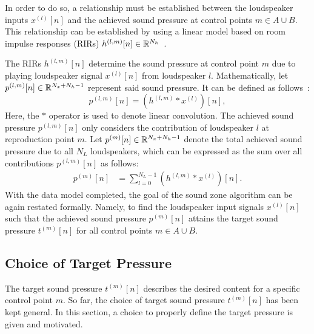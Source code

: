 In order to do so, a relationship must be established between the loudspeaker inputs $x^{(l)}[n]$
and the achieved sound pressure at control points $m\in A \cup B$. 
This relationship can be established by using a linear model based on room impulse responses (RIRs) $h^{(l,m)}[n]\in\mathbb{R}^{N_h}$~\cite{habets2006room}.

The RIRs $h^{(l,m)}[n]$ determine the sound pressure at control point $m$ due to playing 
loudspeaker signal $x^{(l)}[n]$ from loudspeaker $l$. 
Mathematically, let $p^{(l,m)}[n]\in\mathbb{R}^{N_x + N_h - 1}$ represent said sound pressure. 
It can be defined as follows~\cite{betlehem2015personal}:
\begin{equation}
    p^{(l,m)}[n] = \left(h^{(l,m)} \ast x^{(l)}\right)[n],
\end{equation}
Here, the $\ast$ operator is used to denote linear convolution. 
The achieved sound pressure $p^{(l,m)}[n]$ only considers the contribution of loudspeaker $l$ at reproduction point $m$.
Let $p^{(m)}[n]\in\mathbb{R}^{N_x + N_h - 1}$ denote the total achieved sound pressure due to all $N_L$ loudspeakers,
which can be expressed as the sum over all contributions $p^{(l,m)}[n]$ as follows: 
\begin{align}
    p^{(m)}[n] &= \sum_{l=0}^{N_L - 1} \left(h^{(l,m)} \ast x^{(l)}\right)[n].
    \label{eq:sound_zone:data_model:achieved_pressure}
\end{align}
With the data model completed, the goal of the sound zone algorithm can be again restated formally.
Namely, to find the loudspeaker input signals $x^{(l)}[n]$ such that the achieved sound pressure $p^{(m)}[n]$ attains the
target sound pressure $t^{(m)}[n]$ for all control points $m\in A \cup B$.

\subsection{Choice of Target Pressure}
\label{ch:sound_zone:data_model:target_pressure_choice}
The target sound pressure $t^{(m)}[n]$ describes the desired content for a specific control point $m$. 
So far, the choice of target sound pressure $t^{(m)}[n]$ has been kept general. 
In this section, a choice to properly define the target pressure is given and motivated.

